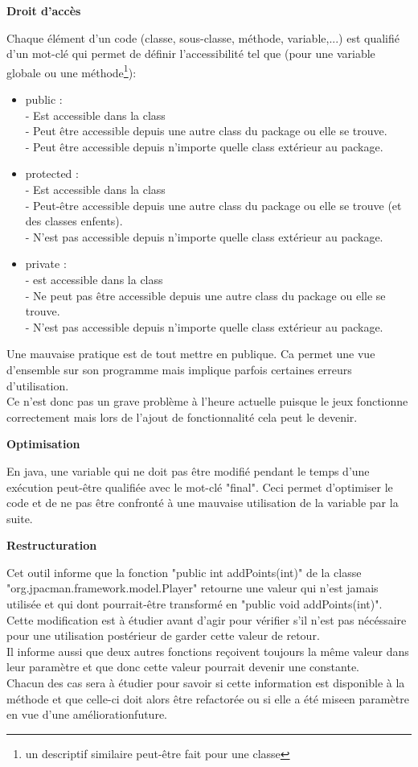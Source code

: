 \documentclass[12pt,a4paper,final]{article}
\newcommand{\smalltitle}[1]{\bigskip\large\textbf{#1}\par\normalsize\medskip}
\begin{document}
\smalltitle{Droit d'accès}
Chaque élément d'un code (classe, sous-classe, méthode, variable,...) est qualifié d'un mot-clé qui permet de définir l'accessibilité tel que (pour une variable globale ou une méthode\footnote{un descriptif similaire peut-être fait pour une classe}): 
\begin{itemize}
\item public : \\
- Est accessible dans la class\\
- Peut être accessible depuis une autre class du package ou elle se trouve.\\
- Peut être accessible depuis n'importe quelle class extérieur au package.
\item protected :\\
- Est accessible dans la class\\
- Peut-être accessible depuis une autre class du package ou elle se trouve (et des classes enfents).\\
- N'est pas accessible depuis n'importe quelle class extérieur au package.
\item private :\\
- est accessible dans la class\\
- Ne peut pas être accessible depuis une autre class du package ou elle se trouve.\\
- N'est pas accessible depuis n'importe quelle class extérieur au package.
\end{itemize}
Une mauvaise pratique est de tout mettre en publique. Ca permet une vue d'ensemble sur son programme mais implique parfois certaines erreurs d'utilisation.\\
Ce n'est donc pas un grave problème à l'heure actuelle puisque le jeux fonctionne correctement mais lors de l'ajout de fonctionnalité cela peut le devenir.

\smalltitle{Optimisation}
En java, une variable qui ne doit pas être modifié pendant le temps d'une exécution peut-être qualifiée avec le mot-clé "final". Ceci permet d'optimiser le code et de ne pas être confronté à une mauvaise utilisation de la variable par la suite.


\smalltitle{Restructuration}
Cet outil informe que la fonction "public int addPoints(int)" de la classe "org.jpacman.framework.model.Player" retourne une valeur qui n'est jamais utilisée et qui dont pourrait-être transformé en "public void addPoints(int)".\\
Cette modification est à étudier avant d'agir pour vérifier s'il n'est pas nécéssaire pour une utilisation postérieur de garder cette valeur de retour.\\
Il informe aussi que deux autres fonctions reçoivent toujours la même valeur dans leur paramètre et que donc cette valeur pourrait devenir une constante.\\
Chacun des cas sera à étudier pour savoir si cette information est disponible à la méthode et que celle-ci doit alors être refactorée ou si elle a été miseen paramètre en vue d'une améliorationfuture.
\end{document}
